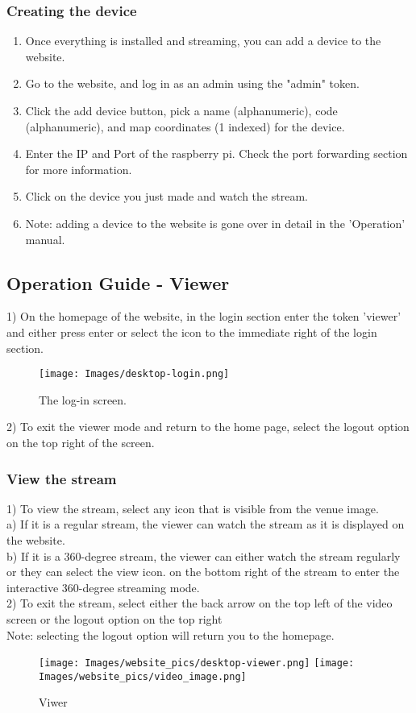 \documentclass[onecolumn, draftclsnofoot,10pt, compsoc]{IEEEtran}
\begin{document}
\subsubsection{Creating the device}
\begin{enumerate}
    \item Once everything is installed and streaming, you can add a device to the website.
    \item  Go to the website, and log in as an admin using the "admin" token.
    \item Click the add device button, pick a name (alphanumeric), code (alphanumeric), and map coordinates (1 indexed) for the device.
    \item Enter the IP and Port of the raspberry pi. Check the port forwarding section for more information.
    \item Click on the device you just made and watch the stream.
    \item Note: adding a device to the website is gone over in detail in the 'Operation' manual. 
\end{enumerate}
\newpage
\subsection{Operation Guide - Viewer}
1)  On the homepage of the website, in the login section enter the token 'viewer' and either press enter or select the icon to the immediate right of the login section.\\
\begin{figure}[h]
    \centering
    \texttt{[image: Images/desktop-login.png]} 
    \caption{The log-in screen.}
\label{fig1}
\end{figure}
2) To exit the viewer mode and return to the home page, select the logout option on the top right of the screen.
\subsubsection{View the stream}
1) To view the stream, select any icon that is visible from the venue image. \\
    \hspace*{1cm} a) If it is a regular stream, the viewer can watch the stream as it is displayed on the website. \\
    \hspace*{1cm} b) If it is a 360-degree stream, the viewer can either watch the stream regularly or they can select the view icon. 
    \hspace*{1cm} on the bottom right of the stream to enter the interactive 360-degree streaming mode. \\
2) To exit the stream, select either the back arrow on the top left of the video screen or the logout option on the top right \\ 
\hspace*{1cm} Note: selecting the logout option will return you to the homepage. 
\begin{figure}[h]%
    \centering
    \texttt{[image: Images/website\_pics/desktop-viewer.png]}%
    \qquad
    \texttt{[image: Images/website\_pics/video\_image.png]}
    \caption{Viwer}
\end{figure}
\newpage
\end{document}
